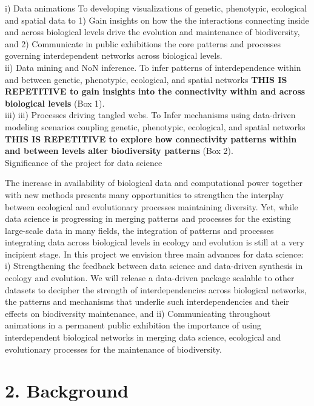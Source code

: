 \documentclass[12pt]{article}
\begin{document}
i) Data animations
To developing visualizations of genetic, phenotypic, ecological and spatial data to 1) Gain insights on how the the interactions connecting inside and across biological levels drive the evolution and maintenance of biodiversity, and 2) Communicate in public exhibitions the core patterns and processes governing interdependent networks across biological levels.
\\
ii) Data mining and NoN inference. To infer patterns of interdependence within and between genetic, phenotypic, ecological, and spatial networks {\bf THIS IS REPETITIVE to gain insights into the connectivity within and across biological levels} (Box 1).
\\
iii) iii)	Processes driving tangled webs. To Infer mechanisms using data-driven modeling scenarios coupling genetic, phenotypic, ecological, and spatial networks {\bf THIS IS REPETITIVE to explore how connectivity patterns within and between levels alter biodiversity patterns} (Box 2).
\\
Significance of the project for data science

The increase in availability of biological data and computational power together with new
methods presents many opportunities to strengthen the interplay between ecological and
evolutionary processes maintaining diversity. Yet, while data science is progressing in merging
patterns and processes for the existing large-scale data in many fields, the integration of
patterns and processes integrating data across biological levels in ecology and evolution is still
at a very incipient stage. In this project we envision three main advances for data science:
i) Strengthening the feedback between data science and data-driven synthesis in ecology and
evolution. We will release a data-driven package scalable to other datasets to decipher the
strength of interdependencies across biological networks, the patterns and mechanisms that
underlie such interdependencies and their effects on biodiversity maintenance, and
ii) Communicating throughout animations in a permanent public exhibition the importance of
using interdependent biological networks in merging data science, ecological and evolutionary
processes for the maintenance of biodiversity.


\section*{2. Background}
\end{document}
